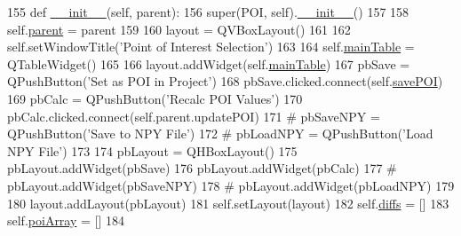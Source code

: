 \begin{DoxyCode}
155     \textcolor{keyword}{def }\hyperlink{classsoftware_1_1chipwhisperer_1_1analyzer_1_1utils_1_1TraceExplorerScripts_1_1PartitionDisplay_1_1POI_afc94ebe517ab338a82b581c7036c7ffa}{\_\_init\_\_}(self, parent):
156         super(POI, self).\hyperlink{classsoftware_1_1chipwhisperer_1_1analyzer_1_1utils_1_1TraceExplorerScripts_1_1PartitionDisplay_1_1POI_afc94ebe517ab338a82b581c7036c7ffa}{\_\_init\_\_}()
157 
158         self.\hyperlink{classsoftware_1_1chipwhisperer_1_1analyzer_1_1utils_1_1TraceExplorerScripts_1_1PartitionDisplay_1_1POI_a5365ab9885cd9f79ca294ebd0a48fdda}{parent} = parent
159 
160         layout = QVBoxLayout()
161 
162         self.setWindowTitle(\textcolor{stringliteral}{'Point of Interest Selection'})
163 
164         self.\hyperlink{classsoftware_1_1chipwhisperer_1_1analyzer_1_1utils_1_1TraceExplorerScripts_1_1PartitionDisplay_1_1POI_a7fe266919c72a3e1dd148b0eebf63fc7}{mainTable} = QTableWidget()
165 
166         layout.addWidget(self.\hyperlink{classsoftware_1_1chipwhisperer_1_1analyzer_1_1utils_1_1TraceExplorerScripts_1_1PartitionDisplay_1_1POI_a7fe266919c72a3e1dd148b0eebf63fc7}{mainTable})
167         pbSave = QPushButton(\textcolor{stringliteral}{'Set as POI in Project'})
168         pbSave.clicked.connect(self.\hyperlink{classsoftware_1_1chipwhisperer_1_1analyzer_1_1utils_1_1TraceExplorerScripts_1_1PartitionDisplay_1_1POI_ad546799627b06ad46316556fa62713eb}{savePOI})
169         pbCalc = QPushButton(\textcolor{stringliteral}{'Recalc POI Values'})
170         pbCalc.clicked.connect(self.parent.updatePOI)
171         \textcolor{comment}{# pbSaveNPY = QPushButton('Save to NPY File')}
172         \textcolor{comment}{# pbLoadNPY = QPushButton('Load NPY File')}
173 
174         pbLayout = QHBoxLayout()
175         pbLayout.addWidget(pbSave)
176         pbLayout.addWidget(pbCalc)
177         \textcolor{comment}{# pbLayout.addWidget(pbSaveNPY)}
178         \textcolor{comment}{# pbLayout.addWidget(pbLoadNPY)}
179 
180         layout.addLayout(pbLayout)
181         self.setLayout(layout)
182         self.\hyperlink{classsoftware_1_1chipwhisperer_1_1analyzer_1_1utils_1_1TraceExplorerScripts_1_1PartitionDisplay_1_1POI_a82aa66ff95bc2a0a00bf0462ccb813d6}{diffs} = []
183         self.\hyperlink{classsoftware_1_1chipwhisperer_1_1analyzer_1_1utils_1_1TraceExplorerScripts_1_1PartitionDisplay_1_1POI_adbe8e862b81ccc918b44d82cb1f3fe6d}{poiArray} = []
184 
\end{DoxyCode}


